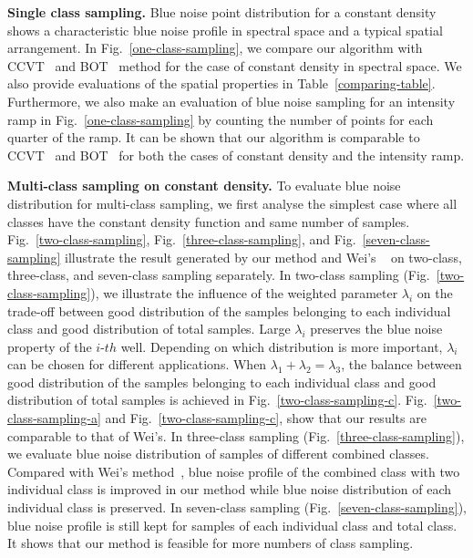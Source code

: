 \textbf{Single class sampling.}
Blue noise point distribution for a constant density
shows a characteristic blue noise profile in spectral space
and a typical spatial arrangement.
In Fig.~\ref{one-class-sampling},
we compare our algorithm with CCVT~\cite{balzer:2009:capacity} and BOT~\cite{de:2012:blue} method for the case of constant density in spectral space.
We also provide evaluations of the spatial properties in Table~\ref{comparing-table}.
Furthermore,
we also make an evaluation of blue noise sampling for an intensity ramp in Fig.~\ref{one-class-sampling}
by counting the number of points for each
quarter of the ramp.
It can be shown that our algorithm is comparable to CCVT~\cite{balzer:2009:capacity} and BOT~\cite{de:2012:blue} for both the cases of constant density and the intensity ramp.

\textbf{Multi-class sampling on constant density.}
To evaluate blue noise distribution for multi-class sampling,
we first analyse the simplest case where all classes have the constant density function and same number of samples.
Fig.~\ref{two-class-sampling}, Fig.~\ref{three-class-sampling},
and Fig.~\ref{seven-class-sampling} illustrate the result generated by our method and Wei's ~\cite{wei:2010:multi} on two-class, three-class, and seven-class sampling separately.
In two-class sampling (Fig.~\ref{two-class-sampling}),
we illustrate the influence of the weighted parameter $\lambda_i$ on the trade-off between good distribution of the samples belonging to each individual class and good distribution of total samples.
Large $\lambda_i$ preserves the blue noise property of the $i$-$th$ well.
Depending on which distribution is more important,
$\lambda_i$ can be chosen for different applications.
When $\lambda_1+\lambda_2=\lambda_3$,
the balance between good distribution of the samples belonging to each individual class and good distribution of total samples
is achieved in Fig.~\ref{two-class-sampling-c}.
Fig.~\ref{two-class-sampling-a} and Fig.~\ref{two-class-sampling-c},
show that our results are comparable to that of Wei's.
In three-class sampling (Fig.~\ref{three-class-sampling}),
we evaluate blue noise distribution of samples of different combined classes.
Compared with Wei's method~\cite{wei:2010:multi},
 blue noise profile of the combined class with two individual class is improved in our method
while blue noise distribution of each individual class is preserved.
In seven-class sampling (Fig.~\ref{seven-class-sampling}),
blue noise profile  is still kept for samples of each individual class and total class.
It shows that our method is feasible for more numbers of class sampling.


